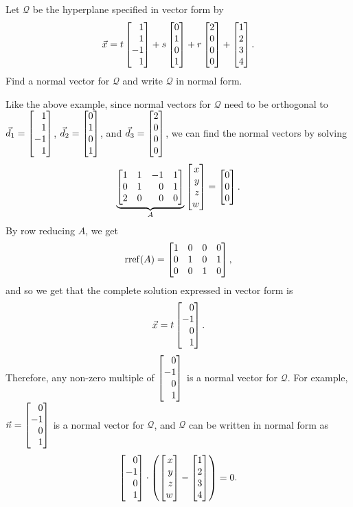 \begin{example}
	Let $\mathcal Q$ be the hyperplane specified in vector form by
	\[
		\vec x=t\mat{1\\1\\-1\\1}+s\mat{0\\1\\0\\1}+r\mat{2\\0\\0\\0}+\mat{1\\2\\3\\4}.
	\]
	Find a normal vector for $\mathcal Q$ and write $\mathcal Q$ in normal form.

	Like the above example, since normal vectors for $\mathcal Q$ need to be orthogonal to $\vec d_1=\mat{1\\1\\-1\\1}$, $\vec d_2=\mat{0\\1\\0\\1}$, and $\vec d_3=\mat{2\\0\\0\\0}$, we can find the normal vectors by solving
	\[
	\underbrace{\mat{1&1&-1&1\\0&1&0&1\\2&0&0&0}}_A\mat{x\\y\\z\\w}=\mat{0\\0\\0}.
    \]
    By row reducing $A$, we get
    \[
        \Rref(A) = \mat{1&0&0&0\\0&1&0&1\\0&0&1&0},
    \]
    and so we get that the complete solution expressed in vector form is
    \[
        \vec x = t\mat{0\\-1\\0\\1}.
	\]
    Therefore, any non-zero multiple of $\mat{0\\-1\\0\\1}$ is a normal vector for $\mathcal Q$. For example, $\vec n =\mat{0\\-1\\0\\1}$ is a normal vector for $\mathcal Q$, and $\mathcal Q$ can be written in normal form as
    \[
	    \mat{0\\-1\\0\\1}\cdot\left(\mat{x\\y\\z\\w}-\mat{1\\2\\3\\4}\right)=0.
    \]
\end{example}



